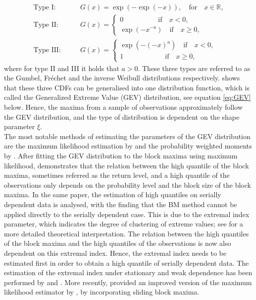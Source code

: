 \documentclass[a4paper,12pt]{article}
\theoremstyle{plain}
\begin{document}
\begin{equation*}
    \begin{split}
        \text{Type I:} \quad & \quad G(x) = \exp{\left(-\exp{\left(-x\right)}\right)}, \quad \text{for} \quad x\in\mathbb{R}, \\
        \text{Type II:} \quad & \quad G(x) = \begin{cases} 0 \quad\quad\quad\quad\quad \text{if} \quad x < 0,\\ \exp{\left(-x^{-a}\right)} \quad \text{if} \quad x\geq 0, \end{cases}\\
        \text{Type III:} \quad & \quad G(x) = \begin{cases} \exp{\left(-\left(-x\right)^a\right)} \quad \text{if} \quad x < 0,\\ 1 \quad\quad\quad\quad\quad\quad \text{if} \quad x\geq 0, \end{cases}
    \end{split}
\end{equation*}
where for type II and III it holds that $a>0$. These three types are referred to as the Gumbel, Fr\'echet and the inverse Weibull distributions respectively.  shows that these three CDFs can be generalised into one distribution function, which is called the Generalized Extreme Value (GEV) distribution, see equation \eqref{eq:GEV} below. Hence, the maxima from a sample of observations approximately follow the GEV distribution, and the type of distribution is dependent on the shape parameter $\xi$. \\

The most notable methods of estimating the parameters of the GEV distribution are the maximum likelihood estimation by  and the probability weighted moments by . After fitting the GEV distribution to the block maxima using maximum likelihood,  demonstrates that the relation between the high quantile of the block maxima, sometimes referred as the return level, and a high quantile of the observations only depends on the probability level and the block size of the block maxima. In the same paper, the estimation of high quantiles on serially dependent data is analysed, with the finding that the BM method cannot be applied directly to the serially dependent case. This is due to the extremal index parameter, which indicates the degree of clustering of extreme values; see  for a more detailed theoretical interpretation. The relation between the high quantiles of the block maxima and the high quantiles of the observations is now also dependent on this extremal index. Hence, the extremal index needs to be estimated first in order to obtain a high quantile of serially dependent data. The estimation of the extremal index under stationary and weak dependence has been performed by  and . More recently,  provided an improved version of the maximum likelihood estimator by , by incorporating sliding block maxima.\\
\end{document}
